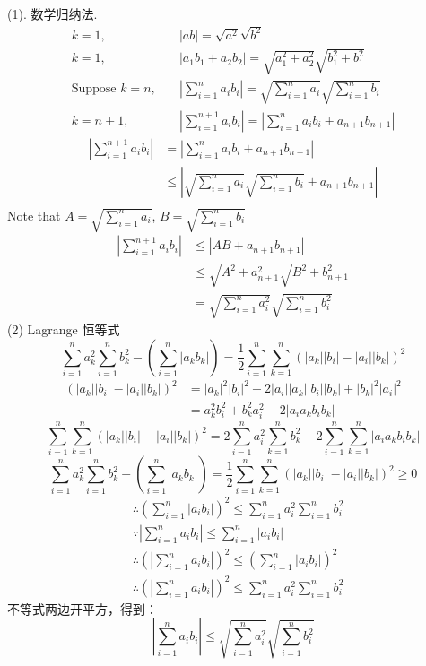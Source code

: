 (1). 数学归纳法.\\
\begin{align*}
	k=1,\quad& |ab|=\sqrt{a^2}\sqrt{b^2}\\
	k=1,\quad& |a_1b_1+a_2b_2|=\sqrt{a_1^2+a_2^2}\sqrt{b_1^2+b_1^2}\\
	\text{Suppose }k=n,\quad&|\sum_{i=1}^n a_ib_i|=\sqrt{\sum_{i=1}^n a_i}\sqrt{\sum_{i=1}^n b_i}\\
	k=n+1,\quad&|\sum_{i=1}^{n+1} a_ib_i|=|\sum_{i=1}^{n} a_ib_i + a_{n+1}b_{n+1}|
\end{align*}
\begin{align*}
	|\sum_{i=1}^{n+1} a_ib_i|
	&=|\sum_{i=1}^{n} a_ib_i + a_{n+1}b_{n+1}|\\
	&\le|\sqrt{\sum_{i=1}^n a_i}\sqrt{\sum_{i=1}^n b_i} + a_{n+1}b_{n+1}|\\
\end{align*}
Note that $ A = \sqrt{\sum_{i=1}^n a_i} $, $ B = \sqrt{\sum_{i=1}^n b_i} $
\begin{align*}
	|\sum_{i=1}^{n+1} a_ib_i|
	&\le|AB+a_{n+1}b_{n+1}|\\
	&\le\sqrt{A^2+a_{n+1}^2}\sqrt{B^2+b_{n+1}^2}\\
	&=\sqrt{\sum_{i=1}^na_i^2}\sqrt{\sum_{i=1}^nb_i^2}
\end{align*}
(2) Lagrange 恒等式
\begin{equation}
	\sum_{i=1}^n a_k^2\sum_{i=1}^n b_k^2 - (\sum_{i=1}^n |a_kb_k|) = \frac{1}{2}\sum_{i=1}^n\sum_{k=1}^n(|a_k||b_i|-|a_i||b_k|)^2
\end{equation}
\begin{align*}
	(|a_k||b_i|-|a_i||b_k|)^2 
	&= |a_k|^2|b_i|^2-2|a_i||a_k||b_i||b_k|+|b_k|^2|a_i|^2\\
	&= a_k^2b_i^2+b_k^2a_i^2-2|a_ia_kb_ib_k|
\end{align*}
\begin{equation*}
	\sum_{i=1}^n\sum_{k=1}^n(|a_k||b_i|-|a_i||b_k|)^2 = 2\sum_{i=1}^n a_i^2 \sum_{k=1}^n b_k^2 - 2\sum_{i=1}^n\sum_{k=1}^n|a_ia_kb_ib_k|
\end{equation*}
\begin{equation*}
	\sum_{i=1}^n a_k^2\sum_{i=1}^n b_k^2 - (\sum_{i=1}^n |a_kb_k|) = \frac{1}{2}\sum_{i=1}^n\sum_{k=1}^n(|a_k||b_i|-|a_i||b_k|)^2 \ge 0
\end{equation*}
\begin{align*}
	&\therefore (\sum_{i=1}^n|a_ib_i|)^2 \le \sum_{i=1}^na_i^2 \sum_{i=1}^nb_i^2\\
	&\because |\sum_{i=1}^n a_i b_i| \le \sum_{i=1}^n|a_ib_i|\\
	&\therefore (|\sum_{i=1}^n a_i b_i|)^2 \le (\sum_{i=1}^n|a_ib_i|)^2\\
	&\therefore (|\sum_{i=1}^n a_i b_i|)^2 \le \sum_{i=1}^n a_i^2 \sum_{i=1}^n b_i^2
\end{align*}
不等式两边开平方，得到：
\begin{equation*}
	|\sum_{i=1}^n a_i b_i| \le \sqrt{\sum_{i=1}^n a_i^2} \sqrt{\sum_{i=1}^n b_i^2}
\end{equation*}

